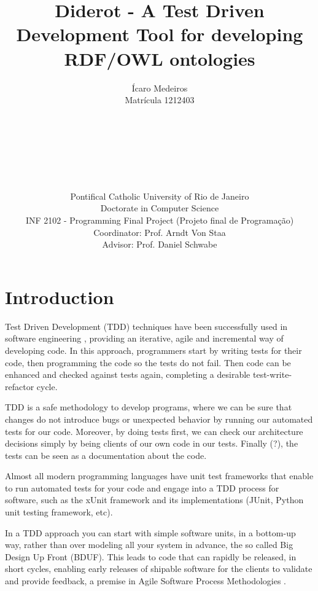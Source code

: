\documentclass{report}
\begin{document}
\title{Diderot - A Test Driven Development Tool for developing RDF/OWL ontologies}
\author{
Ícaro Medeiros\\
Matrícula 1212403
\\ \\ \\ \\ \\ \\ \\ \\
Pontifical Catholic University of Rio de Janeiro \\
Doctorate in Computer Science \\
INF 2102 - Programming Final Project (Projeto final de Programação) \\
Coordinator: Prof. Arndt Von Staa \\
Advisor: Prof. Daniel Schwabe
}

\maketitle
\tableofcontents

\chapter{Introduction}

Test Driven Development (TDD) techniques have been successfully used in
software engineering \cite{beck03}, providing an iterative, agile and incremental way of developing
code. In this approach, programmers start by writing tests for their code, then programming the code
so the tests do not fail. Then code can be enhanced and checked against tests again, completing a desirable
test-write-refactor cycle.

TDD is a safe methodology to develop programs, where we can be sure that changes do not
introduce bugs or unexpected behavior by running our automated tests for our code. Moreover,
by doing tests first, we can check our architecture decisions simply by being clients of our own code
in our tests. Finally (?), the tests can be seen as a documentation about the code.

Almost all modern programming languages have unit test frameworks that enable to run
automated tests for your code and engage into a TDD process for software, such as the xUnit
framework \cite{beck03} and its implementations (JUnit, Python unit testing framework, etc).

In a TDD approach you can start with simple software units, in a bottom-up way,
rather than over modeling all your system in advance, the so called Big Design Up Front (BDUF).
This leads to code that can rapidly be released, in short cycles, enabling early releases of
shipable software for the clients to validate and provide feedback, a premise in Agile
Software Process Methodologies \cite{beck01, beck04, martin03}.
\end{document}
